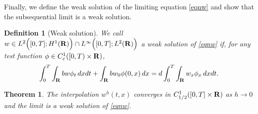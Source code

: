 \documentclass[11pt]{amsart}
\def\R{{\bf R}}
\def\R{{\bf R}}
\newtheorem{theorem}{Theorem}[section]
\newtheorem{definition}{Definition}[section]
\begin{document}
Finally, we define the weak solution of the limiting equation \eqref{eqnw} and show that the subsequential limit is a weak solution.

\begin{definition}[Weak solution] We call $w \in L^2\Big([0,T];H^1(
\R)\Big) \cap L^\infty\Big([0,T];L^2(\R)\Big)$ a weak solution of
\eqref{eqnw} if, for any test function $\phi \in
C_c^1([0,T)\times \R)$,
 \begin{equation}\label{DefWeak}
  \int_0^T\int_\R  b w\phi_t\,dxdt
  +\int_\R b w_0\phi(0,x)\,dx = d\int_0^T\int_\R w_x\phi_x\, dxdt.
 \end{equation}
\end{definition}

\begin{theorem}
  The interpolation $w^{h}(t,x)$ converges in $C^1_{1/2}([0,T]\times\R)$ as $h\to0$ and the limit is a weak solution of \eqref{eqnw}.
\end{theorem}
\end{document}
